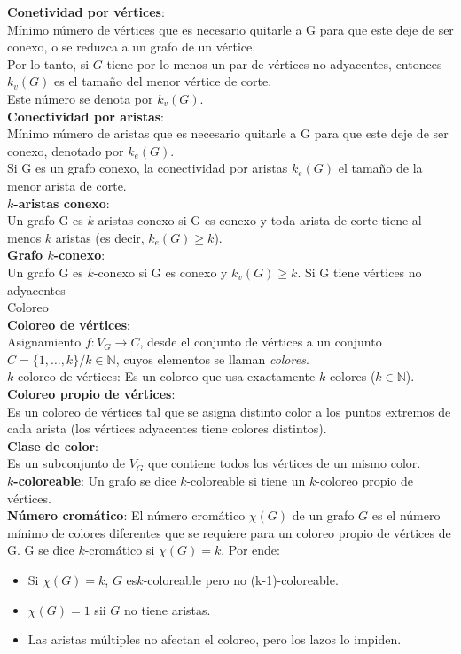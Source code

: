 \documentclass[a4paper,11pt]{report}
\begin{document}
 \newpage
{\bf Conetividad por vértices}: \\
Mínimo número de vértices que es necesario quitarle a G para que este deje de ser conexo, o se reduzca a un grafo de un vértice.\\
Por lo tanto, si $G$ tiene por lo menos un par de vértices no adyacentes, entonces $k_v(G)$ es el tamaño del menor vértice de corte. \\
Este número se denota por $k_v(G)$.\\[15pt]
{\bf Conectividad por aristas}: \\
Mínimo número de aristas que es necesario quitarle a G para que este deje de ser conexo, denotado por $k_e(G)$.\\
Si G es un grafo conexo, la conectividad por aristas $k_e(G)$ el tamaño de la menor arista de corte.\\
{\bf $k$-aristas conexo}:\\
Un grafo G es $k$-aristas conexo si G es conexo y toda arista de corte tiene al menos $k$ aristas (es decir, $k_e(G) \geqslant k$).\\
{\bf Grafo $k$-conexo}: \\
Un grafo G es $k$-conexo si G es conexo y $k_v(G)\geqslant k$. Si G tiene vértices no adyacentes\\

\newpage
Coloreo \\

{\bf Coloreo de vértices}:\\
Asignamiento $f: V_G \to C$, desde el conjunto de vértices a un conjunto $C=\{1,\dots,k\} / k \in \mathbb{N}$, cuyos elementos se llaman \emph{colores}.\\
$k$-coloreo de vértices: Es un coloreo que usa exactamente $k$ colores ($k \in \mathbb{N}$).\\
{\bf Coloreo propio de vértices}:\\
Es un coloreo de vértices tal que se asigna distinto color a los puntos extremos de cada arista (los vértices adyacentes tiene colores distintos). \\
{\bf Clase de color}:\\
Es un subconjunto de $V_G$ que contiene todos los vértices de un mismo color. \\
{\bf $k$-coloreable}: Un grafo se dice $k$-coloreable si tiene un $k$-coloreo propio de vértices. \\
{\bf Número cromático}: El número cromático $\chi(G)$ de un grafo $G$ es el número mínimo de colores diferentes que se requiere para un coloreo propio de vértices de G. G se dice $k$-cromático si $\chi(G)=k$. Por ende:\\
\begin{itemize}
\item Si $\chi(G)=k$, $G$ es$k$-coloreable pero no (k-1)-coloreable.
\item $\chi(G)=1$ sii $G$ no tiene aristas.
\item Las aristas múltiples no afectan el coloreo, pero los lazos lo impiden.
\end{itemize}
\end{document}
